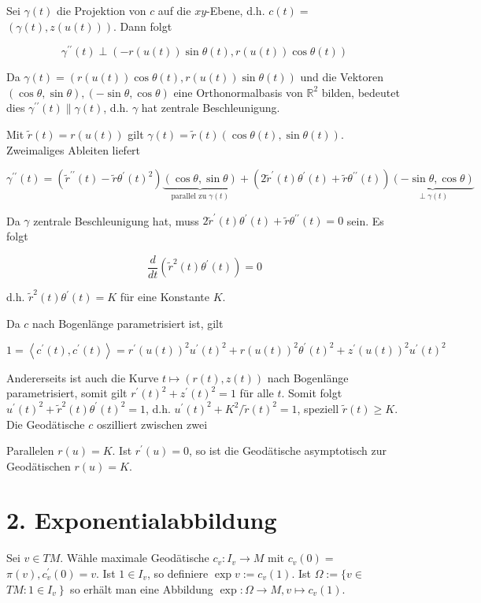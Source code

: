 \documentclass[10pt, letterpaper]{article}
\begin{document}
Sei $\gamma(t)$ die Projektion von $c$ auf die $x y$-Ebene, d.h. $c(t)=$ $(\gamma(t), z(u(t)))$. Dann folgt

$$
\gamma^{\prime \prime}(t) \perp(-r(u(t)) \sin \theta(t), r(u(t)) \cos \theta(t))
$$

Da $\gamma(t)=(r(u(t)) \cos \theta(t), r(u(t)) \sin \theta(t))$ und die Vektoren $(\cos \theta, \sin \theta),(-\sin \theta, \cos \theta)$ eine Orthonormalbasis von $\mathbb{R}^{2}$ bilden, bedeutet dies $\gamma^{\prime \prime}(t) \| \gamma(t)$, d.h. $\gamma$ hat zentrale Beschleunigung.

Mit $\tilde{r}(t)=r(u(t))$ gilt $\gamma(t)=\tilde{r}(t)(\cos \theta(t), \sin \theta(t))$. Zweimaliges Ableiten liefert

$$
\gamma^{\prime \prime}(t)=\left(\tilde{r}^{\prime \prime}(t)-\tilde{r} \theta^{\prime}(t)^{2}\right) \underbrace{(\cos \theta, \sin \theta)}_{\text {parallel zu } \gamma(t)}+\left(2 \tilde{r}^{\prime}(t) \theta^{\prime}(t)+\tilde{r} \theta^{\prime \prime}(t)\right) \underbrace{(-\sin \theta, \cos \theta)}_{\perp \gamma(t)}
$$

Da $\gamma$ zentrale Beschleunigung hat, muss $2 \tilde{r}^{\prime}(t) \theta^{\prime}(t)+\tilde{r} \theta^{\prime \prime}(t)=0$ sein. Es folgt

$$
\frac{d}{d t}\left(\tilde{r}^{2}(t) \theta^{\prime}(t)\right)=0
$$

d.h. $\tilde{r}^{2}(t) \theta^{\prime}(t)=K$ für eine Konstante $K$.

Da $c$ nach Bogenlänge parametrisiert ist, gilt

$$
1=\left\langle c^{\prime}(t), c^{\prime}(t)\right\rangle=r^{\prime}(u(t))^{2} u^{\prime}(t)^{2}+r(u(t))^{2} \theta^{\prime}(t)^{2}+z^{\prime}(u(t))^{2} u^{\prime}(t)^{2}
$$

Andererseits ist auch die Kurve $t \mapsto(r(t), z(t))$ nach Bogenlänge parametrisiert, somit gilt $r^{\prime}(t)^{2}+z^{\prime}(t)^{2}=1$ für alle $t$. Somit folgt $u^{\prime}(t)^{2}+\tilde{r}^{2}(t) \theta^{\prime}(t)^{2}=1$, d.h. $u^{\prime}(t)^{2}+K^{2} / \tilde{r}(t)^{2}=1$, speziell $\tilde{r}(t) \geq K$. Die Geodätische $c$ oszilliert zwischen zwei

Parallelen $r(u)=K$. Ist $r^{\prime}(u)=0$, so ist die Geodätische asymptotisch zur Geodätischen $r(u)=K$.

\section*{2. Exponentialabbildung}
Sei $v \in T M$. Wähle maximale Geodätische $c_{v}: I_{v} \rightarrow M$ mit $c_{v}(0)=$ $\pi(v), c_{v}^{\prime}(0)=v$. Ist $1 \in I_{v}$, so definiere $\exp v:=c_{v}(1)$. Ist $\Omega:=\{v \in$ $\left.T M: 1 \in I_{v}\right\}$ so erhält man eine Abbildung $\exp : \Omega \rightarrow M, v \mapsto c_{v}(1)$.
\end{document}
